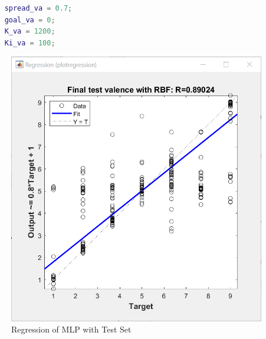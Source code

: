 \begin{lstlisting}[language=Matlab]
	%Parameters for training the RBF for valence
	spread_va = 0.7;
	goal_va = 0;
	K_va = 1200;
	Ki_va = 100;
\end{lstlisting}

\begin{figure}[H]
	\centering
	\includegraphics[width=0.5\linewidth]{img/valence_rbf_0_7.png}
	\caption{Regression of MLP with Test Set}
\end{figure}
